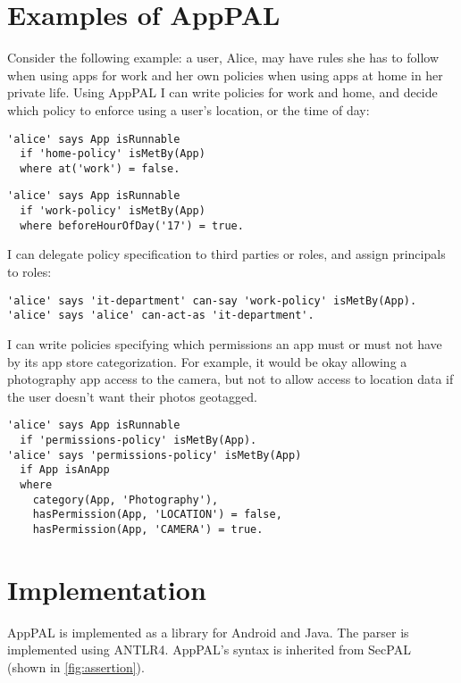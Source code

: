 \documentclass[thesis.tex]{subfiles}
\begin{document}
\section{Examples of AppPAL}

Consider the following example: a user, Alice, may have rules she has to follow
when using apps for work and her own policies when using apps at home in her
private life. Using AppPAL I can write policies for work and home, and decide
which policy to enforce using a user's location, or the time of day:

\begin{lstlisting}
'alice' says App isRunnable
  if 'home-policy' isMetBy(App)
  where at('work') = false.
\end{lstlisting}
\begin{lstlisting}
'alice' says App isRunnable
  if 'work-policy' isMetBy(App)
  where beforeHourOfDay('17') = true.
\end{lstlisting}

I can delegate policy specification to third parties or roles, and assign principals to roles:

\begin{lstlisting}
'alice' says 'it-department' can-say 'work-policy' isMetBy(App).
'alice' says 'alice' can-act-as 'it-department'.
\end{lstlisting}

I can write policies specifying which permissions an app must or must not have
by its app store categorization. For example, it would be okay allowing a
photography app access to the camera, but not to allow access to location data
if the user doesn't want their photos geotagged.

\begin{lstlisting}
'alice' says App isRunnable
  if 'permissions-policy' isMetBy(App).
'alice' says 'permissions-policy' isMetBy(App)
  if App isAnApp
  where
    category(App, 'Photography'),
    hasPermission(App, 'LOCATION') = false,
    hasPermission(App, 'CAMERA') = true.
\end{lstlisting}

\section{Implementation}

AppPAL is implemented as a library for Android and Java.
The parser is implemented using ANTLR4.
AppPAL's syntax is inherited from SecPAL~\cite{becker_secpal:_2010} (shown in \autoref{fig:assertion}).
\end{document}
